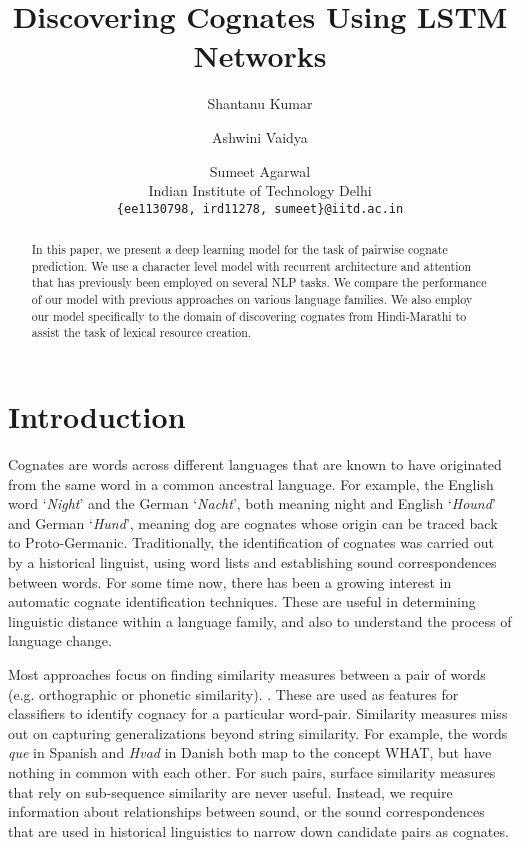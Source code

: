 \documentclass[11pt,letterpaper]{article}
\title{Discovering Cognates Using LSTM Networks}
\author{Shantanu Kumar \and Ashwini Vaidya \and Sumeet Agarwal \\ 
  Indian Institute of Technology Delhi
  \\ {\tt \{ee1130798, ird11278, sumeet\}@iitd.ac.in}}
\date{}
\begin{document}
\maketitle

\begin{abstract}
In this paper, we present a deep learning model for the task of pairwise cognate prediction. We use a character level model with recurrent architecture and attention that has previously been employed on several NLP tasks. We compare the performance of our model with previous approaches on various language families. We also employ our model specifically to the domain of discovering cognates from Hindi-Marathi to assist the task of lexical resource creation.
\end{abstract}

\section{Introduction}
Cognates are words across different languages that are known to have originated from the same word in a common ancestral language. For example, the English word `\textit{Night}' and the German `\textit{Nacht}’, both meaning night and English `\textit{Hound}’ and German `\textit{Hund}’, meaning dog are cognates whose origin can be traced back to Proto-Germanic. Traditionally, the identification of cognates was carried out by a historical linguist, using word lists and establishing sound correspondences between words. For some time now, there has been a growing interest in automatic cognate identification techniques. These are useful in determining linguistic distance within a language family, and also to understand the process of language change. 

Most approaches focus on finding similarity measures between a pair of words (e.g. orthographic or phonetic similarity). \citep{hauer2011clustering, inkpen2005similarity,List2016g}. These are used as features for classifiers to identify cognacy for a particular word-pair. Similarity measures miss out on capturing generalizations beyond string similarity. For example, the words \textit{que} in Spanish and \textit{Hvad} in Danish both map to the concept \textsc{WHAT}, but have nothing in common with each other. For such pairs, surface similarity measures that rely on sub-sequence similarity are never useful. Instead, we require information about relationships between sound, or the sound correspondences that are used in historical linguistics to narrow down candidate pairs as cognates.
\end{document}
